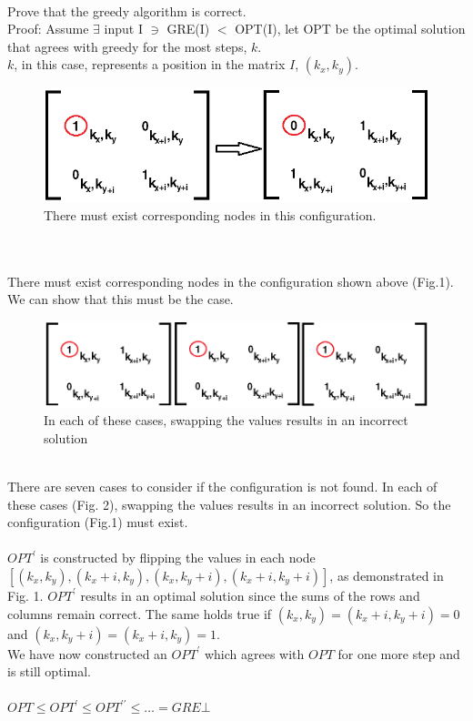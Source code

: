 \documentclass[10pt]{article}
\begin{document}
			\\
			Prove that the greedy algorithm is correct.\\
			Proof: Assume $\exists$ input I $\ni$ GRE(I) $<$ OPT(I), let OPT be the optimal solution that agrees with greedy
			for the most steps, $k$.\\
			$k$, in this case, represents a position in the matrix $I$, $(k_x,k_y)$.
			\\
\begin{figure}[h]
	\centering
		\includegraphics[width=450px]{greedy13fig1.png}
	  \caption{There must exist corresponding nodes in this configuration.}
\end{figure}
			\\
			\\
			There must exist corresponding nodes in the configuration shown above (Fig.1). We can show that this must be the case.
			\\
\begin{figure}[h]
	\centering
		\includegraphics[width=450px]{greedy13fig2.png}
	  \caption{In each of these cases, swapping the values results in an incorrect solution}
\end{figure}
			\\
			There are seven cases to consider if the configuration is not found. In each of these cases (Fig. 2), swapping the values
			results in an incorrect solution. So the configuration (Fig.1) must exist.\\
			\\
			$OPT^\prime$ is constructed by flipping the values in each node $[(k_x,k_y), (k_x+i,k_y), (k_x,k_y+i), (k_x+i,k_y+i)]$,
			as demonstrated in Fig. 1. $OPT^\prime$ results in an optimal solution since the sums of the rows and columns remain correct.
	    The same holds true if $(k_x,k_y) = (k_x+i,k_y+i) = 0$ and $(k_x,k_y+i) = (k_x+i,k_y) = 1$.
	    \\
	    We have now constructed an $OPT^\prime$ which agrees with $OPT$ for one more step and is still optimal.\\
	    \\
	    $OPT \leq OPT^{\prime} \leq OPT^{\prime\prime} \leq \ldots = GRE \bot$\\
			\\
\end{document}
